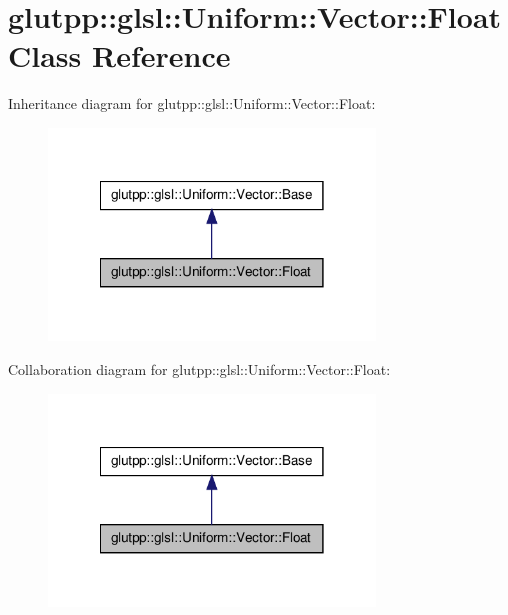 \hypertarget{classglutpp_1_1glsl_1_1Uniform_1_1Vector_1_1Float}{\section{glutpp\-:\-:glsl\-:\-:\-Uniform\-:\-:\-Vector\-:\-:\-Float \-Class \-Reference}
\label{classglutpp_1_1glsl_1_1Uniform_1_1Vector_1_1Float}
}


\-Inheritance diagram for glutpp\-:\-:glsl\-:\-:\-Uniform\-:\-:\-Vector\-:\-:\-Float\-:\nopagebreak
\begin{figure}[H]
\begin{center}
\leavevmode
\includegraphics[width=246pt]{classglutpp_1_1glsl_1_1Uniform_1_1Vector_1_1Float__inherit__graph}
\end{center}
\end{figure}


\-Collaboration diagram for glutpp\-:\-:glsl\-:\-:\-Uniform\-:\-:\-Vector\-:\-:\-Float\-:\nopagebreak
\begin{figure}[H]
\begin{center}
\leavevmode
\includegraphics[width=246pt]{classglutpp_1_1glsl_1_1Uniform_1_1Vector_1_1Float__coll__graph}
\end{center}
\end{figure}
